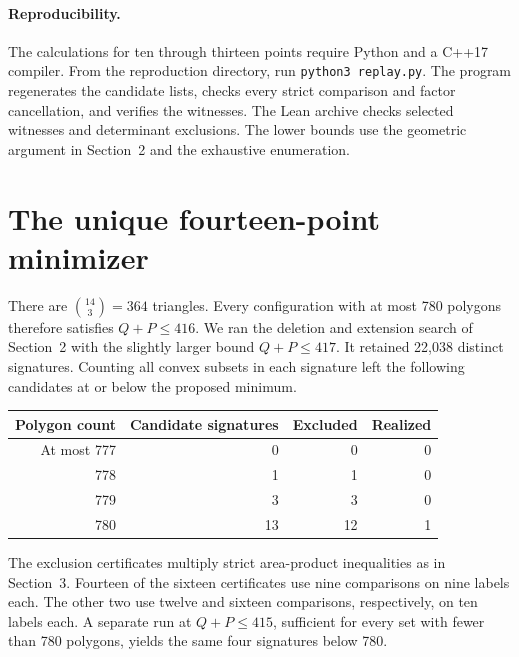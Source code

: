 \documentclass[11pt]{article}
\begin{document}
\paragraph{Reproducibility.} The calculations for ten through thirteen points require Python and a C++17 compiler. From the reproduction directory, run \texttt{python3 replay.py}. The program regenerates the candidate lists, checks every strict comparison and factor cancellation, and verifies the witnesses. The Lean archive checks selected witnesses and determinant exclusions. The lower bounds use the geometric argument in Section~2 and the exhaustive enumeration.

\newpage
\section{The unique fourteen-point minimizer}
There are $\binom{14}{3}=364$ triangles. Every configuration with at most 780 polygons therefore satisfies $Q+P\le416$. We ran the deletion and extension search of Section~2 with the slightly larger bound $Q+P\le417$. It retained 22,038 distinct signatures. Counting all convex subsets in each signature left the following candidates at or below the proposed minimum.
\begin{center}
\begin{tabular}{r r r r}\toprule
Polygon count & Candidate signatures & Excluded & Realized\\\midrule
At most 777 & 0 & 0 & 0\\
778 & 1 & 1 & 0\\
779 & 3 & 3 & 0\\
780 & 13 & 12 & 1\\\bottomrule
\end{tabular}
\end{center}
The exclusion certificates multiply strict area-product inequalities as in Section~3. Fourteen of the sixteen certificates use nine comparisons on nine labels each. The other two use twelve and sixteen comparisons, respectively, on ten labels each. A separate run at $Q+P\le415$, sufficient for every set with fewer than 780 polygons, yields the same four signatures below 780.
\end{document}
